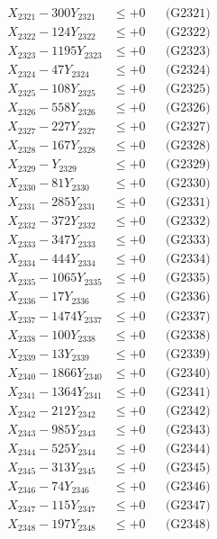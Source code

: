 \documentclass[a4paper,10pt]{article}
\begin{document}
{\begin{align}
\allowbreak
X_{2321} - 300Y_{2321} &\leq +0 && \text{(G2321)} \\
X_{2322} - 124Y_{2322} &\leq +0 && \text{(G2322)} \\
X_{2323} - 1195Y_{2323} &\leq +0 && \text{(G2323)} \\
X_{2324} - 47Y_{2324} &\leq +0 && \text{(G2324)} \\
X_{2325} - 108Y_{2325} &\leq +0 && \text{(G2325)} \\
X_{2326} - 558Y_{2326} &\leq +0 && \text{(G2326)} \\
X_{2327} - 227Y_{2327} &\leq +0 && \text{(G2327)} \\
X_{2328} - 167Y_{2328} &\leq +0 && \text{(G2328)} \\
X_{2329} - Y_{2329} &\leq +0 && \text{(G2329)} \\
X_{2330} - 81Y_{2330} &\leq +0 && \text{(G2330)} \\
\allowbreak
X_{2331} - 285Y_{2331} &\leq +0 && \text{(G2331)} \\
X_{2332} - 372Y_{2332} &\leq +0 && \text{(G2332)} \\
X_{2333} - 347Y_{2333} &\leq +0 && \text{(G2333)} \\
X_{2334} - 444Y_{2334} &\leq +0 && \text{(G2334)} \\
X_{2335} - 1065Y_{2335} &\leq +0 && \text{(G2335)} \\
X_{2336} - 17Y_{2336} &\leq +0 && \text{(G2336)} \\
X_{2337} - 1474Y_{2337} &\leq +0 && \text{(G2337)} \\
X_{2338} - 100Y_{2338} &\leq +0 && \text{(G2338)} \\
X_{2339} - 13Y_{2339} &\leq +0 && \text{(G2339)} \\
X_{2340} - 1866Y_{2340} &\leq +0 && \text{(G2340)} \\
\allowbreak
X_{2341} - 1364Y_{2341} &\leq +0 && \text{(G2341)} \\
X_{2342} - 212Y_{2342} &\leq +0 && \text{(G2342)} \\
X_{2343} - 985Y_{2343} &\leq +0 && \text{(G2343)} \\
X_{2344} - 525Y_{2344} &\leq +0 && \text{(G2344)} \\
X_{2345} - 313Y_{2345} &\leq +0 && \text{(G2345)} \\
X_{2346} - 74Y_{2346} &\leq +0 && \text{(G2346)} \\
X_{2347} - 115Y_{2347} &\leq +0 && \text{(G2347)} \\
X_{2348} - 197Y_{2348} &\leq +0 && \text{(G2348)} \\

\end{align}}
\end{document}
